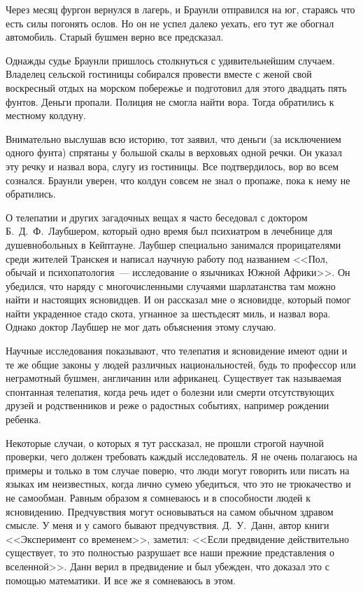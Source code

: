 \documentclass[12pt,a4paper,twoside,openany,svgnames]{memoir}
\begin{document}
Через месяц фургон вернулся в лагерь, и Браунли отправился на юг, стараясь что есть силы погонять ослов. Но он не успел далеко уехать, его тут же обогнал автомобиль. Старый бушмен верно все предсказал.

Однажды судье Браунли пришлось столкнуться с удивительнейшим случаем. Владелец сельской гостиницы собирался провести вместе с женой свой воскресный отдых на морском побережье и подготовил для этого двадцать пять фунтов. Деньги пропали. Полиция не смогла найти вора. Тогда обратились к местному колдуну.

Внимательно выслушав всю историю, тот заявил, что деньги (за исключением одного фунта) спрятаны у большой скалы в верховьях одной речки. Он указал эту речку и назвал вора, слугу из гостиницы. Все подтвердилось, вор во всем сознался. Браунли уверен, что колдун совсем не знал о пропаже, пока к нему не обратились.

О телепатии и других загадочных вещах я часто беседовал с доктором Б.~Д.~Ф.~Лаубшером, который одно время был психиатром в лечебнице для душевнобольных в Кейптауне. Лаубшер специально занимался прорицателями среди жителей Транскея и написал научную работу под названием <<Пол, обычай и психопатология~--- исследование о язычниках Южной Африки>>. Он убедился, что наряду с многочисленными случаями шарлатанства там можно найти и настоящих ясновидцев. И он рассказал мне о ясновидце, который помог найти украденное стадо скота, угнанное за шестьдесят миль, и назвал вора. Однако доктор Лаубшер не мог дать объяснения этому случаю.

Научные исследования показывают, что телепатия и ясновидение имеют одни и те же общие законы у людей различных национальностей, будь то профессор или неграмотный бушмен, англичанин или африканец. Существует так называемая спонтанная телепатия, когда речь идет о болезни или смерти отсутствующих друзей и родственников и реже о радостных событиях, например рождении ребенка.

Некоторые случаи, о которых я тут рассказал, не прошли строгой научной проверки, чего должен требовать каждый исследователь. Я не очень полагаюсь на примеры и только в том случае поверю, что люди могут говорить или писать на языках им неизвестных, когда лично сумею убедиться, что это не трюкачество и не самообман. Равным образом я сомневаюсь и в способности людей к ясновидению. Предчувствия могут основываться на самом обычном здравом смысле. У меня и у самого бывают предчувствия. Д.~У.~Данн, автор книги <<Эксперимент со временем>>, заметил: <<Если предвидение действительно существует, то это полностью разрушает все наши прежние представления о вселенной>>. Данн верил в предвидение и был убежден, что доказал это с помощью математики. И все же я сомневаюсь в этом.
\end{document}

